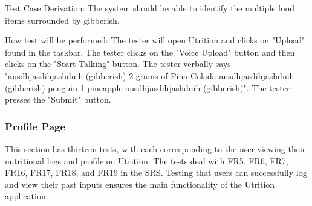 \documentclass[12pt, titlepage]{article}
\begin{document}
\begin{enumerate}
	Test Case Derivation: The system should be able to identify the multiple food items surrounded by gibberish.
	
	How test will be performed: The tester will open Utrition and clicks on "Upload" found in the taskbar. The tester clicks on the "Voice Upload" button and then clicks on the "Start Talking" button. The tester verbally says "ausdhjasdihjashduih (gibberish) 2 grams of Pina Colada ausdhjasdihjashduih (gibberish) penguin 1 pineapple ausdhjasdihjashduih (gibberish)". The tester presses the "Submit" button.
	
\end{enumerate}
	
	\subsubsection{Profile Page}
	This section has thirteen tests, with each corresponding to the user viewing their nutritional logs and profile on Utrition. The tests deal with FR5, FR6, FR7, FR16, FR17, FR18, and FR19 in the SRS. Testing that users can successfully log and view their past inputs ensures the main functionality of the Utrition application.
	
\end{document}

